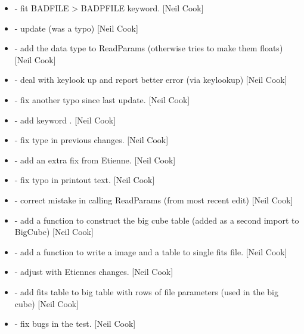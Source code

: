\documentclass[a4paper,10pt,english]{report}
\begin{document}
\begin{itemize}
\item {} 
 - fit BADFILE \textendash{}\textgreater{} BADPFILE keyword. {[}Neil Cook{]}

\item {} 
 - update  (was a typo) {[}Neil Cook{]}

\item {} 
 - add the data type to ReadParams (otherwise
tries to make them floats) {[}Neil Cook{]}

\item {} 
 - deal with keylook up and report better error (via
keylookup) {[}Neil Cook{]}

\item {} 
 - fix another typo since last update. {[}Neil
Cook{]}

\item {} 
 - add keyword . {[}Neil Cook{]}

\item {} 
 - fix type in previous changes. {[}Neil Cook{]}

\item {} 
 - add an extra fix from Etienne. {[}Neil
Cook{]}

\item {} 
 - fix typo in printout text. {[}Neil Cook{]}

\item {} 
 - correct mistake in calling ReadParams (from
most recent edit) {[}Neil Cook{]}

\item {} 
 - add a function to construct the big cube table
(added as a second import to BigCube) {[}Neil Cook{]}

\item {} 
 - add a  function to write a image and
a table to single fits file. {[}Neil Cook{]}

\item {} 
 - adjust with Etiennes changes. {[}Neil Cook{]}

\item {} 
 - add fits table to big table with rows of file
parameters (used in the big cube) {[}Neil Cook{]}

\item {} 
 - fix bugs in the test. {[}Neil Cook{]}

\end{itemize}
\end{document}
